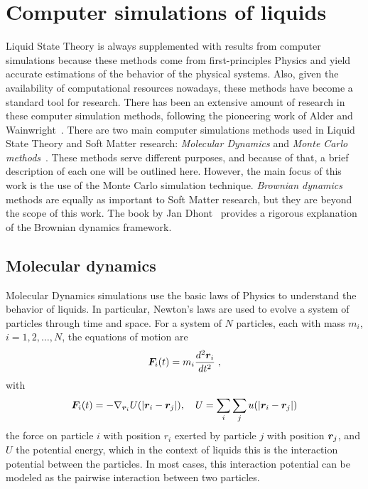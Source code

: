 \section{Computer simulations of liquids}

Liquid State Theory is always supplemented with results from computer simulations
because these methods come from first-principles Physics and yield accurate estimations
of the behavior of the physical systems. Also, given the availability of computational
resources nowadays, these methods have become a standard tool for research.
There has been an extensive amount of research in these computer simulation methods,
following the pioneering work of Alder and Wainwright~\cite{alderPhaseTransitionHard1957a}.
There are two main computer simulations methods used in Liquid State Theory and
Soft Matter research: \emph{Molecular Dynamics} and \emph{Monte Carlo methods}~\cite{allenComputerSimulationLiquids2017,frenkelUnderstandingMolecularSimulation2001}.
These methods serve different purposes, and because of that, a brief description of each
one will be outlined here. However, the main focus of this work is the use of
the Monte Carlo simulation technique. \emph{Brownian dynamics} methods are
equally as important to Soft Matter research, but they are beyond the scope of this work.
The book by Jan Dhont~\cite{dhontIntroductionDynamicsColloids1996} provides a rigorous
explanation of the Brownian dynamics framework.

\subsection{Molecular dynamics}
Molecular Dynamics simulations use the basic laws of Physics to understand the behavior
of liquids. In particular, Newton's laws are used to evolve a system of particles through
time and space. For a system of $N$ particles, each with mass $m_i$, $i=1,2,\dots,N$,
the equations of motion are
\begin{equation}
    \bm{F}_i (t) = m_i \frac{d^2 \bm{r}_i}{dt^2} \; ,
    \label{eq:newton}
\end{equation}
with
\begin{equation}
    \bm{F}_i (t) = - \nabla_{\bm{r}_i} U(\lvert \bm{r}_i - \bm{r}_j \rvert)
    , \quad U = \sum_{i} \sum_{j} u(\lvert \bm{r}_i - \bm{r}_j \rvert)
    \label{eq:newton-potential}
\end{equation}
the force on particle $i$ with position $r_i$ exerted by particle $j$ with position
$\bm{r}_j$, and $U$ the potential energy, which in the context of liquids this is the
interaction potential between the particles. In most cases, this interaction potential
can be modeled as the pairwise interaction between two particles.

